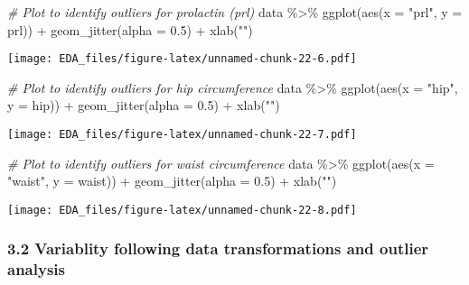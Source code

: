 \documentclass[
]{article}
\newenvironment{Shaded}{\begin{snugshade}}{\end{snugshade}}
\newcommand{\AttributeTok}[1]{\textcolor[rgb]{0.77,0.63,0.00}{#1}}
\newcommand{\CommentTok}[1]{\textcolor[rgb]{0.56,0.35,0.01}{\textit{#1}}}
\newcommand{\FloatTok}[1]{\textcolor[rgb]{0.00,0.00,0.81}{#1}}
\newcommand{\FunctionTok}[1]{\textcolor[rgb]{0.00,0.00,0.00}{#1}}
\newcommand{\NormalTok}[1]{#1}
\newcommand{\SpecialCharTok}[1]{\textcolor[rgb]{0.00,0.00,0.00}{#1}}
\newcommand{\StringTok}[1]{\textcolor[rgb]{0.31,0.60,0.02}{#1}}
\begin{document}
\begin{Shaded}
\begin{Highlighting}[]
\CommentTok{\# Plot to identify outliers for prolactin (prl)}
\NormalTok{data }\SpecialCharTok{\%\textgreater{}\%} 
  \FunctionTok{ggplot}\NormalTok{(}\FunctionTok{aes}\NormalTok{(}\AttributeTok{x =} \StringTok{"prl"}\NormalTok{, }\AttributeTok{y =}\NormalTok{ prl)) }\SpecialCharTok{+}
  \FunctionTok{geom\_jitter}\NormalTok{(}\AttributeTok{alpha =} \FloatTok{0.5}\NormalTok{) }\SpecialCharTok{+}
  \FunctionTok{xlab}\NormalTok{(}\StringTok{""}\NormalTok{)}
\end{Highlighting}
\end{Shaded}

\texttt{[image: EDA\_files/figure-latex/unnamed-chunk-22-6.pdf]}

\begin{Shaded}
\begin{Highlighting}[]
\CommentTok{\# Plot to identify outliers for hip circumference}
\NormalTok{data }\SpecialCharTok{\%\textgreater{}\%} 
  \FunctionTok{ggplot}\NormalTok{(}\FunctionTok{aes}\NormalTok{(}\AttributeTok{x =} \StringTok{"hip"}\NormalTok{, }\AttributeTok{y =}\NormalTok{ hip)) }\SpecialCharTok{+}
  \FunctionTok{geom\_jitter}\NormalTok{(}\AttributeTok{alpha =} \FloatTok{0.5}\NormalTok{) }\SpecialCharTok{+}
  \FunctionTok{xlab}\NormalTok{(}\StringTok{""}\NormalTok{)}
\end{Highlighting}
\end{Shaded}

\texttt{[image: EDA\_files/figure-latex/unnamed-chunk-22-7.pdf]}

\begin{Shaded}
\begin{Highlighting}[]
\CommentTok{\# Plot to identify outliers for waist circumference}
\NormalTok{data }\SpecialCharTok{\%\textgreater{}\%} 
  \FunctionTok{ggplot}\NormalTok{(}\FunctionTok{aes}\NormalTok{(}\AttributeTok{x =} \StringTok{"waist"}\NormalTok{, }\AttributeTok{y =}\NormalTok{ waist)) }\SpecialCharTok{+}
  \FunctionTok{geom\_jitter}\NormalTok{(}\AttributeTok{alpha =} \FloatTok{0.5}\NormalTok{) }\SpecialCharTok{+}
  \FunctionTok{xlab}\NormalTok{(}\StringTok{""}\NormalTok{)}
\end{Highlighting}
\end{Shaded}

\texttt{[image: EDA\_files/figure-latex/unnamed-chunk-22-8.pdf]}

\hypertarget{variablity-following-data-transformations-and-outlier-analysis}{%
\subsubsection{3.2 Variablity following data transformations and outlier
analysis}\label{variablity-following-data-transformations-and-outlier-analysis}}
\end{document}
